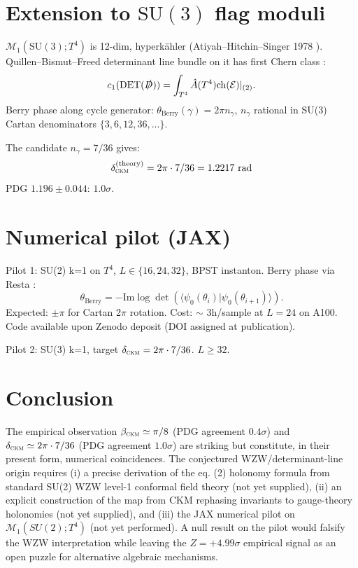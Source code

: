 \documentclass[5p,times,twocolumn]{elsarticle}
\newcommand{\CKM}{\textsc{ckm}}
\begin{document}
\section{Extension to $\mathrm{SU}(3)$ flag moduli}
$\mathcal{M}_{1}(\mathrm{SU}(3); T^4)$ is 12-dim, hyperkähler (Atiyah--Hitchin--Singer 1978 \cite{AtiyahHitchinSinger1978}). Quillen--Bismut--Freed determinant line bundle on it has first Chern class \cite{BismutFreed1986}:
\begin{equation}
c_1(\mathrm{DET}(\slashed{D})) = \int_{T^4} \hat{A}(T^4) \mathrm{ch}(\mathcal{E})|_{(2)}.
\end{equation}
Berry phase along cycle generator: $\theta_{\mathrm{Berry}}(\gamma) = 2\pi n_\gamma$, $n_\gamma$ rational in SU(3) Cartan denominators $\{3, 6, 12, 36, ...\}$.

The candidate $n_\gamma = 7/36$ gives:
\begin{equation}
\delta_{\CKM}^{(\text{theory})} = 2\pi \cdot 7/36 = 1.2217 ~\mathrm{rad}
\end{equation}
PDG $1.196 \pm 0.044$: $1.0\sigma$.

\section{Numerical pilot (JAX)}
Pilot 1: SU(2) k=1 on $T^4$, $L \in \{16, 24, 32\}$, BPST instanton. Berry phase via Resta \cite{Resta1998}:
\begin{equation}
\theta_{\mathrm{Berry}} = -\mathrm{Im}\log \det(\langle\psi_0(\theta_i)|\psi_0(\theta_{i+1})\rangle).
\end{equation}
Expected: $\pm\pi$ for Cartan 2$\pi$ rotation. Cost: $\sim$ 3h/sample at $L = 24$ on A100. Code available upon Zenodo deposit (DOI assigned at publication).

Pilot 2: SU(3) k=1, target $\delta_{\CKM} = 2\pi \cdot 7/36$. $L \geq 32$.

\section{Conclusion}
The empirical observation $\beta_{\CKM} \simeq \pi/8$ (PDG agreement $0.4\sigma$) and $\delta_{\CKM} \simeq 2\pi \cdot 7/36$ (PDG agreement $1.0\sigma$) are striking but constitute, in their present form, numerical coincidences. The conjectured WZW/determinant-line origin requires (i) a precise derivation of the eq. (2) holonomy formula from standard SU(2) WZW level-1 conformal field theory (not yet supplied), (ii) an explicit construction of the map from CKM rephasing invariants to gauge-theory holonomies (not yet supplied), and (iii) the JAX numerical pilot on $\mathcal{M}_1(SU(2); T^4)$ (not yet performed). A null result on the pilot would falsify the WZW interpretation while leaving the $Z = +4.99\sigma$ empirical signal as an open puzzle for alternative algebraic mechanisms.
\end{document}
